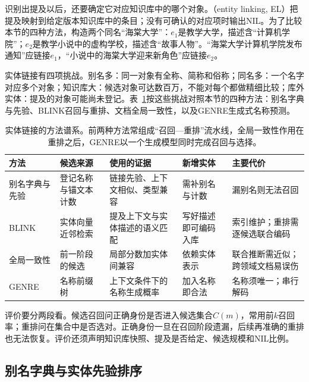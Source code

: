 识别出提及以后，还要确定它对应知识库中的哪个对象。（entity linking, EL）把提及映射到给定版本知识库中的条目；没有可确认的对应项时输出NIL。为了比较本节的四种方法，构造两个同名“海棠大学”：$e_1$是教学大学，描述含“计算机学院”；$e_2$是教学小说中的虚构学校，描述含“故事人物”。“海棠大学计算机学院发布通知”应链接$e_1$，“小说中的海棠大学迎来新角色”应链接$e_2$。

实体链接有四项挑战。别名多：同一对象有全称、简称和俗称；同名多：一个名字对应多个对象；知识库大：候选对象可达数百万，不能对每个都做精细比较；库外实体：提及的对象可能尚未登记。表~\ref{tab:nlp-extraction-linking-methods}按这些挑战对照本节的四种方法：别名字典与先验、BLINK召回与重排、文档全局一致性，以及GENRE生成式名称预测。

\begin{table}[htbp]
  \centering
  \small
  \begin{tabularx}{\linewidth}{@{}>{\raggedright\arraybackslash}p{22mm}>{\raggedright\arraybackslash}p{30mm}>{\raggedright\arraybackslash}X>{\raggedright\arraybackslash}p{30mm}>{\raggedright\arraybackslash}p{34mm}@{}}
    \toprule
    方法 & 候选来源 & 使用的证据 & 新增实体 & 主要代价\\
    \midrule
    别名字典与先验 & 登记名称与锚文本计数 & 链接先验、上下文相似、类型兼容 & 需补别名与计数 & 漏别名则无法召回\\
    BLINK & 实体向量近邻检索 & 提及上下文与实体描述的语义匹配 & 写好描述即可编码入库 & 索引维护；重排需逐候选联合编码\\
    全局一致性 & 前一阶段的候选 & 局部分数加实体间兼容 & 依赖实体表示 & 联合推断需近似；跨领域文档易误伤\\
    GENRE & 名称前缀树 & 上下文条件下的名称生成概率 & 加入名称即合法 & 名称须唯一；串行解码\\
    \bottomrule
  \end{tabularx}
  \caption{实体链接的方法谱系。前两种方法常组成“召回—重排”流水线，全局一致性作用在重排之后，GENRE以一个生成模型同时完成召回与选择。}
  \label{tab:nlp-extraction-linking-methods}
\end{table}

评价要分两段看。候选召回问正确身份是否进入候选集合$C(m)$，常用前$k$召回率；重排问在集合中是否选对。正确身份一旦在召回阶段遗漏，后续再准确的重排也无法恢复。评价还须声明知识库快照、提及是否给定、候选规模和NIL比例。

\subsection{别名字典与实体先验排序}
\label{sec:nlp-extraction-alias}

